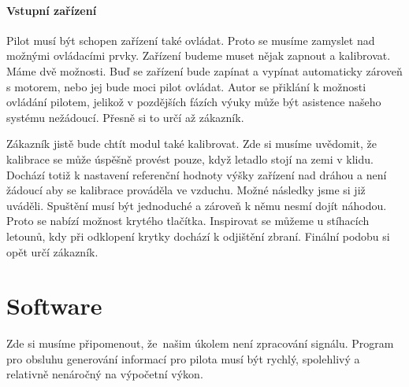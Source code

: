 	\paragraph{Vstupní zařízení}		
		Pilot musí být schopen zařízení také ovládat. Proto se musíme zamyslet nad možnými ovládacími prvky.
		Zařízení budeme muset nějak zapnout a kalibrovat. Máme dvě možnosti. Buď se zařízení bude zapínat a vypínat automaticky zároveň s motorem, nebo jej bude moci pilot ovládat. Autor se přiklání k možnosti ovládání pilotem, jelikož v pozdějších fázích výuky může být asistence našeho systému nežádoucí. Přesně si to určí až zákazník.\par
		Zákazník jistě bude chtít modul také kalibrovat. Zde si musíme uvědomit, že kalibrace se může úspěšně provést pouze, když letadlo stojí na zemi v klidu. Dochází totiž k nastavení referenční hodnoty výšky zařízení nad dráhou a není žádoucí aby se kalibrace prováděla ve vzduchu. Možné následky jsme si již uváděli. Spuštění musí být jednoduché a zároveň k němu nesmí dojít náhodou. Proto se nabízí možnost krytého tlačítka. Inspirovat se můžeme u stíhacích letounů, kdy při odklopení krytky dochází k odjištění zbraní. Finální podobu si opět určí zákazník.
	
	\section{Software}\label{navrhReseni::software}
		Zde si musíme připomenout, že~našim úkolem není zpracování signálu. Program pro obsluhu generování informací pro pilota musí být rychlý, spolehlivý a relativně nenáročný na výpočetní výkon.
		

